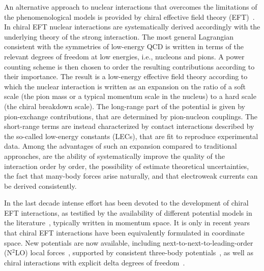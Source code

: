 \documentclass[aps,prc,twocolumn,superscriptaddress,floatfix]{revtex4-1}
\begin{document}
An alternative approach to nuclear interactions that overcomes the limitations
of the phenomenological models is provided by chiral effective field theory 
(EFT)~\cite{Epelbaum:2009,Machleidt:2011}.
In chiral EFT nuclear interactions are systematically derived accordingly with 
the underlying theory of the strong interaction. The most general 
Lagrangian consistent with the symmetries of low-energy QCD is written in terms 
of the relevant degrees of freedom at low energies, i.e., nucleons and pions.
A power counting scheme is then chosen to order the resulting contributions according 
to their importance. The result is a low-energy effective field theory according
to which the nuclear interaction is written as an expansion on the ratio of a 
soft scale (the pion mass or a typical momentum scale in the nucleus) to a
hard scale (the chiral breakdown scale). The long-range part of the potential
is given by pion-exchange contributions, that are determined by pion-nucleon 
couplings. The short-range terms are instead characterized by contact
interactions described by the so-called low-energy constants (LECs), that are fit to 
reproduce experimental data. Among the advantages of such an 
expansion compared to traditional approaches, are the ability of 
systematically improve the quality of the interaction order by order, 
the possibility of estimate theoretical uncertainties, the fact that
many-body forces arise naturally, and that electroweak currents can 
be derived consistently.

In the last decade intense effort has been devoted to the 
development of chiral EFT interactions, as testified by the 
availability of different potential models in the 
literature~\cite{Epelbaum:2009,Machleidt:2011,Ekstrom:2013,Entem:2015,
Epelbaum:2015,Ekstrom:2015,Ekstrom:2017}, typically written in momentum 
space. It is only in recent
years that chiral EFT interactions have been equivalently formulated 
in coordinate space. New potentials are now available, including 
next-to-next-to-leading-order (N$^2$LO) local 
forces~\cite{Gezerlis:2013,Gezerlis:2014}, supported by consistent
three-body potentials~\cite{Tews:2016,Lynn:2016}, as
well as chiral interactions with explicit delta degrees of
freedom~\cite{Piarulli:2015,Piarulli:2016,Piarulli:2017,Ekstrom:2017}.
\end{document}
